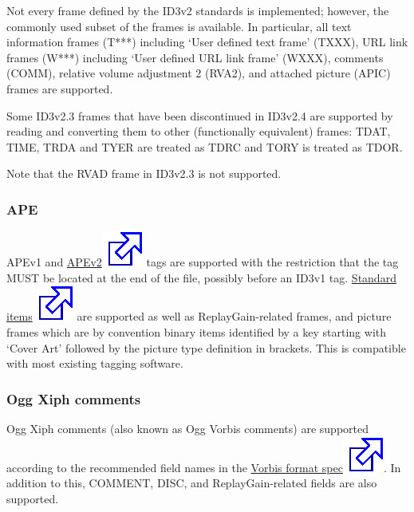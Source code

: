 \documentclass[10pt,english]{article}
\begin{document}
Not every frame defined by the ID3v2 standards is
implemented; however, the commonly used subset of the frames
is available. In particular, all text information frames
(T***) including `User defined text frame' (TXXX), URL
link frames (W***) including `User defined URL link
frame' (WXXX), comments (COMM), relative volume
adjustment 2 (RVA2), and attached picture (APIC) frames are
supported.




Some ID3v2.3 frames that have been discontinued in
ID3v2.4 are supported by reading and converting them to
other (functionally equivalent) frames: TDAT, TIME, TRDA and
TYER are treated as TDRC and TORY is treated as TDOR.




Note that the RVAD frame in ID3v2.3 is not supported.




\subsubsection{APE\label{idp789984}}



\noindent APEv1 and \href{http://wiki.hydrogenaudio.org/index.php?title=APEv2_specification}{APEv2\includegraphics[scale=0.5]{external.eps}}
tags are supported with the restriction that the tag MUST be
located at the end of the file, possibly before an ID3v1
tag. \href{http://wiki.hydrogenaudio.org/index.php?title=APE_key}{Standard
items\includegraphics[scale=0.5]{external.eps}} are supported as well as ReplayGain-related
frames, and picture frames which are by convention binary
items identified by a key starting with `Cover Art'
followed by the picture type definition in brackets. This is
compatible with most existing tagging software.




\subsubsection{Ogg Xiph comments\label{idp793408}}



\noindent Ogg Xiph comments (also known as Ogg Vorbis comments) are
supported according to the recommended field names in the \href{http://xiph.org/vorbis/doc/v-comment.html}{Vorbis
format spec\includegraphics[scale=0.5]{external.eps}}. In addition to this, COMMENT, DISC, and
ReplayGain-related fields are also supported.
\end{document}
